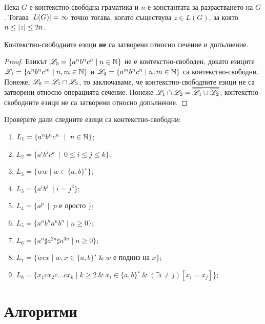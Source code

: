 \begin{crl}
  Нека $G$ е контекстно-свободна граматика и $n$ е константата за разрастването на $G$.
  Тогава $\vert{L(G)}\vert = \infty$ точно тогава, когато съществува $z \in L(G)$, за която $n \leq \vert{z}\vert \leq 2n$.
\end{crl}

\begin{thm}
  Контекстно-свободните езици {\bf не} са затворени относно сечение и допълнение.
\end{thm}
\begin{proof}
  Езикът $\mathscr{L}_0 = \{a^nb^nc^n\mid n\in\mathbb{N}\}$ не е контекстно-свободен, докато езиците 
  $\mathscr{L}_1 = \{a^nb^nc^m\mid n,m\in\mathbb{N}\}$ и $\mathscr{L}_2 = \{a^mb^nc^n\mid n,m\in\mathbb{N}\}$ 
  са контекстно-свободни.
  Понеже, $\mathscr{L}_0 = \mathscr{L}_1\cap\mathscr{L}_2$, то заключаваме, 
  че контекстно-свободните езици не са затворени относно операцията сечение.
  Понеже $\mathscr{L}_1\cap\mathscr{L}_2 = \overline{\overline{\mathscr{L}_1}\cup\overline{\mathscr{L}_2}}$,
  контекстно-свободните езици не са затворени относно допълнение.
\end{proof}


\begin{problem}
  Проверете дали следните езици са контекстно-свободни:
  \begin{enumerate}
  \item
    $L_1 = \{a^nb^nc^n\ \mid\ n\in\N\}$;
  \item
    $L_2 = \{a^ib^jc^k\ \mid\ 0 \leq i \leq j \leq k\}$;
  \item
    $L_3 = \{ww\mid w\in \{a,b\}^\star\}$;
  \item
    $L_3 = \{a^ib^j\ \mid i = j^2\}$;
  \item
    $L_4 = \{a^p\ \mid\ p\mbox{ е просто }\}$;
  \item
    $L_5 = \{a^nb^na^nb^n\mid n\geq 0\}$;
  \item
    $L_6 = \{a^n\sharp a^{2n}\sharp a^{3n}\mid n\geq 0\}$;
  \item
    $L_7 = \{w c x\mid w,x\in \{a,b\}^\star\ \&\ w\mbox{ е подниз на }x\}$;
  \item
    $L_8 = \{x_1 c x_2 c \dots c x_k\mid k\geq 2\ \&\ x_i\in\{a,b\}^\star\ \&\ (\exists i\neq j)[x_i = x_j]\}$;
  \end{enumerate}
\end{problem}

\section{Алгоритми}

